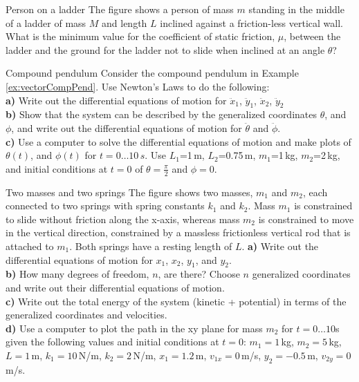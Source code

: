 %
\begin{problem}{Person on a ladder}
\label{prob_Intro_5}
The figure shows a person of mass $m$ standing in the middle of a ladder of mass $M$ and length $L$ inclined against a friction-less vertical wall. What is the minimum value for the coefficient of static friction, $\mu$, between the ladder and the ground for the ladder not to slide when inclined at an angle $\theta$?
\end{problem}
%
\begin{problem}{Compound pendulum}
\label{prob_Intro_6}
Consider the compound pendulum in Example \ref{ex:vectorCompPend}. Use Newton's Laws to do the following:\\
\textbf{a)} Write out the differential equations of motion for $\ddot{x}_1$, $\ddot{y}_1$, $\ddot{x}_2$, $\ddot{y}_2$\\
\textbf{b)} Show that the system can be described by the generalized coordinates $\theta$, and $\phi$, and write out the differential equations of motion for $\ddot{\theta}$ and $\ddot{\phi}$.\\
\textbf{c)} Use a computer to solve the differential equations of motion and make plots of $\theta(t)$, and $\phi(t)$ for $t=0\dots 10\,s$. Use $L_1$=1\,m, $L_2$=0.75\,m, $m_1$=1\,kg, $m_2$=2\,kg, and initial conditions at $t=0$ of $\theta=\frac{\pi}{2}$ and $\phi=0$.
\end{problem}
%
\begin{problem}{Two masses and two springs}
\label{prob_Intro_7}
The figure shows two masses, $m_1$ and $m_2$, each connected to two springs with spring constants $k_1$ and $k_2$. Mass $m_1$ is constrained to slide without friction along the x-axis, whereas mass $m_2$ is constrained to move in the vertical direction, constrained by a massless frictionless vertical rod that is attached to $m_1$. Both springs have a resting length of $L$.
\textbf{a)} Write out the differential equations of motion for $x_1$, $x_2$, $y_1$, and $y_2$.\\
\textbf{b)} How many degrees of freedom, $n$, are there? Choose $n$ generalized coordinates and write out their differential equations of motion.\\
\textbf{c)} Write out the total energy of the system (kinetic + potential) in terms of the generalized coordinates and velocities.\\
\textbf{d)} Use a computer to plot the path in the xy plane for mass $m_2$ for $t=0\dots 10$s given the following values and initial conditions at $t=0$: $m_1=1$\,kg, $m_2=5$\,kg, $L=1$\,m, $k_1=10$\,N/m, $k_2=2$\,N/m, $x_1=1.2$\,m, $v_{1x}=0$\,m/s, $y_2=-0.5$\,m, $v_{2y}=0$\,m/s.
\end{problem}
%

